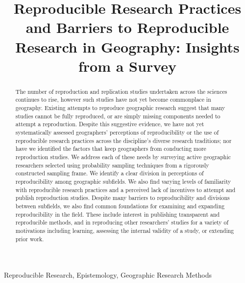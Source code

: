 \documentclass[]{interact}
\theoremstyle{plain}%
\theoremstyle{definition}
\theoremstyle{remark}
\begin{document}
\begin{singlespace}

\title{Reproducible Research Practices and Barriers to Reproducible Research in Geography: Insights from a Survey}

\author{
}

\maketitle

\begin{abstract}
The number of reproduction and replication studies undertaken across the sciences continues to rise, however such studies have not yet become commonplace in geography. 
Existing attempts to reproduce geographic research suggest that many studies cannot be fully reproduced, or are simply missing components needed to attempt a reproduction. 
Despite this suggestive evidence, we have not yet systematically assessed geographers' perceptions of reproducibility or the use of reproducible research practices across the discipline's diverse research traditions; nor have we identified the factors that keep geographers from conducting more reproduction studies.
We address each of these needs by surveying active geographic researchers selected using probability sampling techniques from a rigorously constructed sampling frame.
We identify a clear division in perceptions of reproducibility among geographic subfields. 
We also find varying levels of familiarity with reproducible research practices and a perceived lack of incentives to attempt and publish reproduction studies. 
Despite many barriers to reproducibility and divisions between subfields, we also find common foundations for examining and expanding reproducibility in the field.
These include interest in publishing transparent and reproducible methods, and in reproducing other researchers' studies for a variety of motivations including learning, assessing the internal validity of a study, or extending prior work.


\end{abstract}

\begin{keywords}
Reproducible Research, Epistemology, Geographic Research Methods
\end{keywords}
\end{singlespace}
\end{document}
